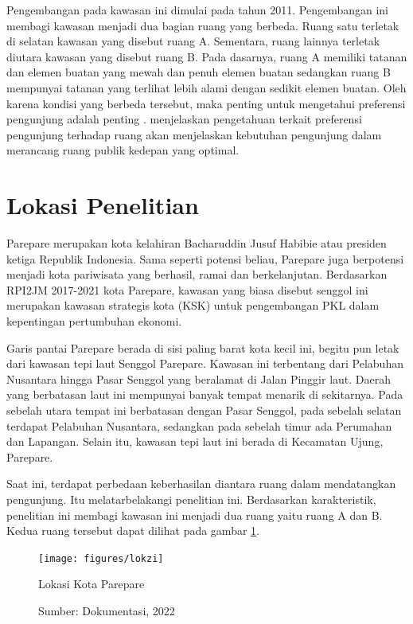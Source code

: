 \documentclass[11pt]{simart} %
\begin{document}
Pengembangan pada kawasan ini dimulai pada tahun 2011.
Pengembangan ini membagi kawasan menjadi dua bagian ruang yang berbeda.
Ruang satu terletak di selatan kawasan yang disebut ruang A. Sementara, ruang lainnya terletak diutara kawasan yang disebut ruang B.
Pada dasarnya, ruang A memiliki tatanan dan elemen buatan yang mewah dan penuh elemen buatan sedangkan ruang B mempunyai tatanan yang terlihat lebih alami dengan sedikit elemen buatan. Oleh karena kondisi yang berbeda tersebut, maka penting untuk mengetahui preferensi pengunjung adalah penting \citep{madureira2018}. \cite{madureira2018} menjelaskan pengetahuan terkait preferensi pengunjung terhadap ruang akan menjelaskan kebutuhan pengunjung dalam merancang ruang publik kedepan yang optimal.

\section{Lokasi Penelitian}

Parepare merupakan kota kelahiran Bacharuddin Jusuf Habibie atau presiden ketiga Republik Indonesia. Sama seperti potensi beliau, Parepare juga berpotensi menjadi kota pariwisata yang berhasil, ramai dan berkelanjutan.
Berdasarkan RPI2JM 2017-2021 kota Parepare, kawasan yang biasa disebut senggol ini merupakan kawasan strategis kota (KSK) untuk pengembangan PKL dalam kepentingan pertumbuhan ekonomi.

Garis pantai Parepare berada di sisi paling barat kota kecil ini, begitu pun letak dari kawasan tepi laut Senggol Parepare.
Kawasan ini terbentang dari Pelabuhan Nusantara hingga Pasar Senggol yang beralamat di Jalan Pinggir laut.
Daerah yang berbatasan laut ini mempunyai banyak tempat menarik di sekitarnya.
Pada sebelah utara tempat ini berbatasan dengan Pasar Senggol, pada sebelah selatan terdapat Pelabuhan Nusantara, sedangkan pada sebelah timur ada Perumahan dan Lapangan. Selain itu, kawasan tepi laut ini berada di Kecamatan Ujung, Parepare.

Saat ini, terdapat perbedaan keberhasilan diantara ruang dalam mendatangkan pengunjung. Itu melatarbelakangi penelitian ini. Berdasarkan karakteristik,
penelitian ini membagi kawasan ini menjadi dua ruang yaitu ruang A dan B. Kedua ruang tersebut dapat dilihat pada gambar \ref{fig:lokzi}.

\begin{figure}[htpb]
    \centering
    \texttt{[image: figures/lokzi]}
    \caption{Lokasi Kota Parepare}
    \caption*{Sumber: Dokumentasi, 2022}
    \label{fig:lokzi}
\end{figure}
\end{document}
